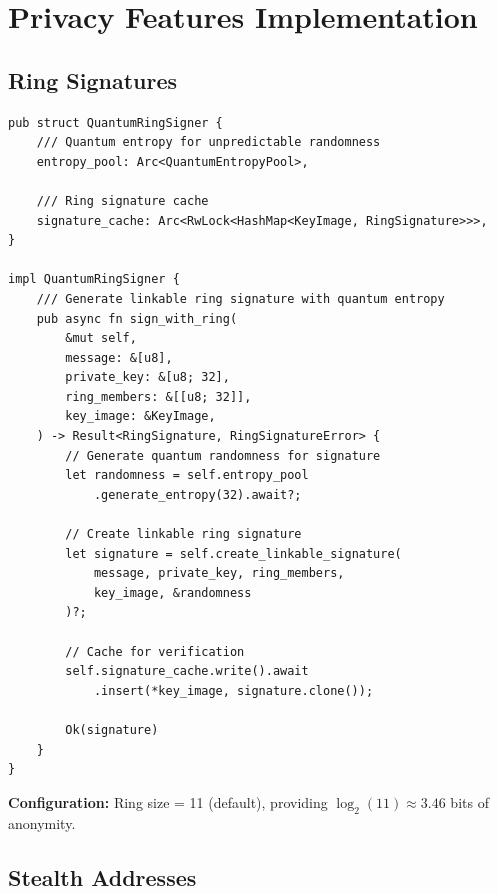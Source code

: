 \documentclass[12pt,a4paper]{article}
\begin{document}
\section{Privacy Features Implementation}

\subsection{Ring Signatures}

\begin{lstlisting}[style=rustcode, caption=Quantum Ring Signature Implementation]
pub struct QuantumRingSigner {
    /// Quantum entropy for unpredictable randomness
    entropy_pool: Arc<QuantumEntropyPool>,

    /// Ring signature cache
    signature_cache: Arc<RwLock<HashMap<KeyImage, RingSignature>>>,
}

impl QuantumRingSigner {
    /// Generate linkable ring signature with quantum entropy
    pub async fn sign_with_ring(
        &mut self,
        message: &[u8],
        private_key: &[u8; 32],
        ring_members: &[[u8; 32]],
        key_image: &KeyImage,
    ) -> Result<RingSignature, RingSignatureError> {
        // Generate quantum randomness for signature
        let randomness = self.entropy_pool
            .generate_entropy(32).await?;

        // Create linkable ring signature
        let signature = self.create_linkable_signature(
            message, private_key, ring_members,
            key_image, &randomness
        )?;

        // Cache for verification
        self.signature_cache.write().await
            .insert(*key_image, signature.clone());

        Ok(signature)
    }
}
\end{lstlisting}

\textbf{Configuration:} Ring size = 11 (default), providing $\log_2(11) \approx 3.46$ bits of anonymity.

\subsection{Stealth Addresses}
\end{document}
